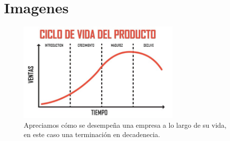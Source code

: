 \documentclass{article}
\begin{document}
\section{Imagenes}
\begin{figure}[htbp]
    \centering
    \includegraphics[width=8cm]{ciclo-de-vida-del-producto.jpg}
    \caption{Apreciamos cómo se desempeña una empresa a lo largo de su vida, en este caso una terminación en decadenecia.}
    \label{}
\end{figure} 
\end{document}
